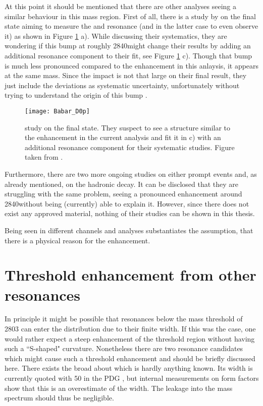 At this point it should be mentioned that there are other analyses seeing a similar behaviour in this \Dz\proton mass region.
First of all, there is a study by \babar on the \Dz\proton final state aiming to measure the \LcResI and \LcResII resonance (and in the latter case to even observe it) as shown in Figure \ref{fig:Babar_D0p} a).
While discussing their systematics, they are wondering if this bump at roughly 2840\mev might change their results by adding an additional resonance component to their fit, see Figure \ref{fig:Babar_D0p} c).
Though that bump is much less pronounced compared to the enhancement in this anlaysis, it appears at the same mass.
Since the impact is not that large on their final result, they just include the deviations as systematic uncertainty, unfortunately without trying to understand the origin of this bump \cite{BaBar_D0p}.
\begin{figure}[tb]
	\centering
	\texttt{[image: Babar\_D0p]}
	\caption{\babar study on the \Dz\proton final state. They suspect to see a structure similar to the enhancement in the current analysis and fit it in c) with an additional resonance component for their systematic studies. Figure taken from \cite{BaBar_D0p}.}
	\label{fig:Babar_D0p}
\end{figure}

Furthermore, there are two more ongoing \lhcb studies on either prompt \Dz\proton events and, as already mentioned, on the hadronic \decay{\Lb}{\Dz\proton\pim} decay.
It can be disclosed that they are struggling with the same problem, seeing a pronounced enhancement around 2840\mev without being (currently) able to explain it.
However, since there does not exist any approved material, nothing of their studies can be shown in this thesis.

Being seen in different channels and analyses substantiates the assumption, that there is a physical reason for the enhancement.

\section{Threshold enhancement from other resonances}
In principle it might be possible that resonances below the \Dz\proton mass threshold of 2803 \mev can enter the distribution due to their finite width.
If this was the case, one would rather expect a steep enhancement of the threshold region without having such a ``S-shaped" curvature.
Nonetheless there are two resonance candidates which might cause such a threshold enhancement and should be briefly discussed here.
There exists the broad  about which is hardly anything known.
Its width is currently quoted with 50 \mev in the PDG \cite{PDG}, but internal \lhcb measurements on \Lb form factors show that this is an overestimate of the  width.
The leakage into the \Dz\proton mass spectrum should thus be negligible.

